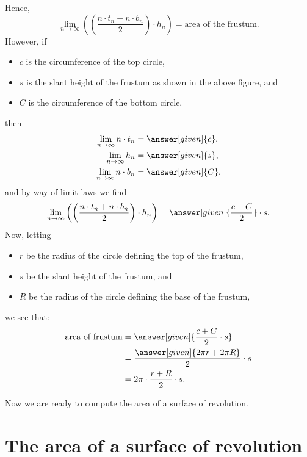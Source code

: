 \documentclass{ximera}
\begin{document}
\begin{theorem}
\begin{explanation}
\begin{image}
    \end{image}
    Hence,
    \[
    \lim_{n\to \infty} \left(\left(\frac{n\cdot t_{n}+n\cdot b_n}{2}\right)\cdot h_n\right) = \text{area of the frustum.}
    \]
    However, if
    \begin{itemize}
    \item $c$ is the circumference of the top circle,
    \item $s$ is the slant height of the frustum as shown in the above
      figure, and 
    \item $C$ is the circumference of the bottom circle,    
    \end{itemize}
    then
    \begin{align*}
      \lim_{n\to \infty} n \cdot t_{n}  &  = \answer[given]{c},\\
      \lim_{n\to \infty} h_{n}  &  = \answer[given]{s},\\
      \lim_{n\to \infty} n\cdot b_{n}  &  = \answer[given]{C},
    \end{align*}
    and by way of limit laws we find
    \[
    \lim_{n\to \infty} \left(\left(\frac{n\cdot t_{n}+n\cdot b_n}{2}\right)\cdot h_n\right) = \answer[given]{\frac{c + C}{2}}\cdot s.
    \]
    Now, letting
    \begin{itemize}
    \item $r$ be the radius of the circle defining the top of the frustum,
    \item $s$ be the slant height of the frustum, and
    \item $R$ be the radius of the circle defining the base of the frustum,
    \end{itemize}
    we see that:
    \begin{align*}
      \text{area of frustum}  &= \answer[given]{\frac{c + C}{2}\cdot s} \\
      &= \frac{\answer[given]{2\pi r + 2\pi R}}{2}\cdot s\\
      &=2\pi \cdot \frac{r+R}{2}\cdot s.
    \end{align*}
  \end{explanation}
\end{theorem}
Now we are ready to compute the area of a surface of revolution.

\section{The area of a surface of revolution}
\end{document}
